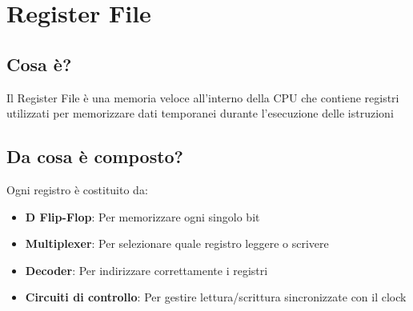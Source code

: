 \chapter{Register File}

\section{Cosa è?}
Il Register File è una memoria veloce all'interno della CPU che contiene registri utilizzati per memorizzare dati temporanei durante l'esecuzione delle istruzioni

\section{Da cosa è composto?}
Ogni registro è costituito da:
\begin{itemize}
    \item \textbf{D Flip-Flop}: Per memorizzare ogni singolo bit
    \item \textbf{Multiplexer}: Per selezionare quale registro leggere o scrivere
    \item \textbf{Decoder}: Per indirizzare correttamente i registri
    \item \textbf{Circuiti di controllo}: Per gestire lettura/scrittura sincronizzate con il clock
\end{itemize}

